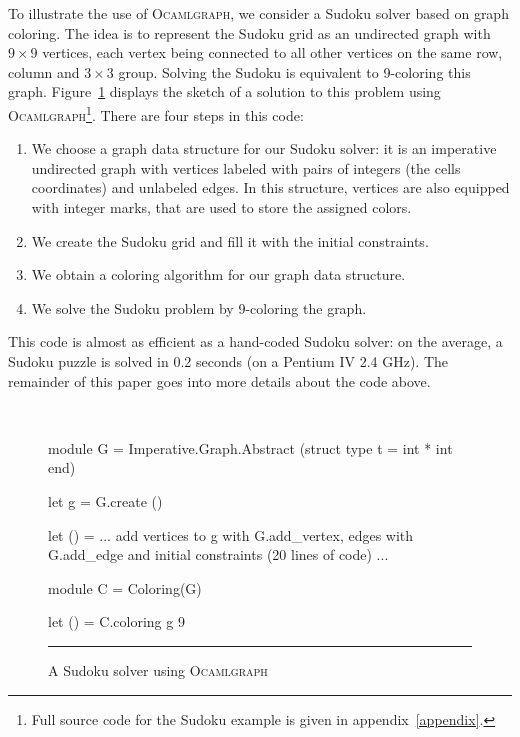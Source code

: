 \documentclass[tfpsymp,pagenumbers]{tfp07symp}
\newcommand{\ocamlgraph}{\textsc{Ocamlgraph}\xspace}
\begin{document}
To illustrate the use of \ocamlgraph, we consider a Sudoku solver
based on graph 
coloring.  The idea is to represent the Sudoku grid as an undirected
graph with $9\times 9$ vertices, each vertex being connected to all
other vertices on the same row, column and $3\times 3$ group.
Solving the Sudoku is equivalent to 9-coloring this graph.
Figure~\ref{fig:sudoku} displays the sketch of a solution to
this problem using \ocamlgraph\footnote{Full source code for the
  Sudoku example is given in appendix~\ref{appendix}.}. There are
four steps in this code:
\begin{enumerate}
\item We choose a graph data structure for our Sudoku solver: it is an
  imperative undirected graph with vertices labeled with pairs of
  integers (the cells coordinates) and unlabeled edges. 
  In this structure, vertices are also
  equipped with integer marks, that are used to store the assigned
  colors.
\item We create the Sudoku grid and fill it with the initial
  constraints.
\item We obtain a coloring algorithm for our graph data structure.
\item We solve the Sudoku problem by 9-coloring the graph.
\end{enumerate}
This code is almost as efficient as a hand-coded Sudoku solver: on the
average, a Sudoku puzzle is solved in 0.2 seconds (on a Pentium IV 2.4
GHz).  The remainder of this paper goes into more details about the
code above.

\begin{figure}[t]
\hrulefill\\[-2em]
\begin{center}
\begin{ocaml}
module G = Imperative.Graph.Abstract
             (struct type t = int * int end) 

let g = G.create ()

let () = 
  ... add vertices to g with G.add_vertex,
      edges with G.add_edge and initial
      constraints (20 lines of code) ...

module C = Coloring(G)       

let () = C.coloring g 9
\end{ocaml}
\end{center}
\hrule

  \caption{A Sudoku solver using \ocamlgraph}
  \label{fig:sudoku}
\end{figure}
 
\end{document}

